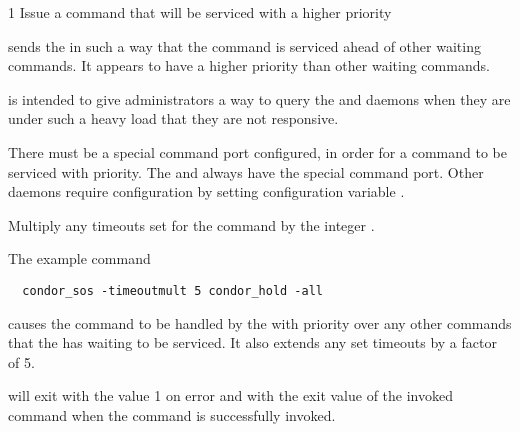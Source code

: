 \begin{ManPage}{\label{man-condor-sos}}{1}
{Issue a command that will be serviced with a higher priority}

\Synopsis {}
\ToolArgsBase


\Description
{} sends the  in such a way 
that the command is serviced ahead of other waiting commands.
It appears to have a higher priority than other waiting commands.

 is intended to give administrators a way to query the
 and  daemons when they are under
such a heavy load that they are not responsive. 

There must be a special command port configured, 
in order for a command to be serviced with priority.
The  and  always have the special
command port.
Other daemons require configuration by setting
configuration variable .

\begin{Options}
  \ToolArgsBaseDesc
    {Multiply any timeouts set for the command by the integer .  }
\end{Options}

\Examples

The example command
\begin{verbatim}
  condor_sos -timeoutmult 5 condor_hold -all
\end{verbatim}
causes the  command to be handled by the
 with priority over any other commands that the 
has waiting to be serviced.
It also extends any set timeouts by a factor of 5.

\ExitStatus

 will exit with the value 1 on error and with the
exit value of the invoked command when the command is successfully
invoked. 

\end{ManPage}
